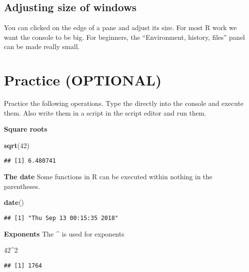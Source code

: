 \documentclass[]{book}
\newenvironment{Shaded}{\begin{snugshade}}{\end{snugshade}}
\newcommand{\KeywordTok}[1]{\textcolor[rgb]{0.13,0.29,0.53}{\textbf{#1}}}
\newcommand{\DecValTok}[1]{\textcolor[rgb]{0.00,0.00,0.81}{#1}}
\newcommand{\OperatorTok}[1]{\textcolor[rgb]{0.81,0.36,0.00}{\textbf{#1}}}
\newcommand{\NormalTok}[1]{#1}
\theoremstyle{definition}
\theoremstyle{definition}
\theoremstyle{definition}
\theoremstyle{remark}
\begin{document}
\subsection{Adjusting size of windows}\label{adjusting-size-of-windows}

You can clicked on the edge of a pane and adjust its size. For most R
work we want the console to be big. For beginners, the ``Environment,
history, files'' panel can be made really small.

\section{Practice (OPTIONAL)}\label{practice-optional}

Practice the following operations. Type the directly into the console
and execute them. Also write them in a script in the script editor and
run them.

\textbf{Square roots}

\begin{Shaded}
\begin{Highlighting}[]
\KeywordTok{sqrt}\NormalTok{(}\DecValTok{42}\NormalTok{)}
\end{Highlighting}
\end{Shaded}

\begin{verbatim}
## [1] 6.480741
\end{verbatim}

\textbf{The date} Some functions in R can be executed within nothing in
the parentheses.

\begin{Shaded}
\begin{Highlighting}[]
\KeywordTok{date}\NormalTok{()}
\end{Highlighting}
\end{Shaded}

\begin{verbatim}
## [1] "Thu Sep 13 00:15:35 2018"
\end{verbatim}

\textbf{Exponents} The \textbf{\^{}} is used for exponents

\begin{Shaded}
\begin{Highlighting}[]
\DecValTok{42}\OperatorTok{^}\DecValTok{2}
\end{Highlighting}
\end{Shaded}

\begin{verbatim}
## [1] 1764
\end{verbatim}
\end{document}
